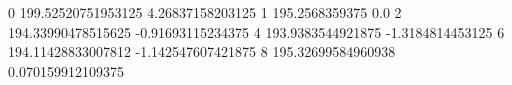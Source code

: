 0 199.52520751953125 4.26837158203125
1 195.2568359375 0.0
2 194.33990478515625 -0.91693115234375
4 193.9383544921875 -1.3184814453125
6 194.11428833007812 -1.142547607421875
8 195.32699584960938 0.070159912109375
